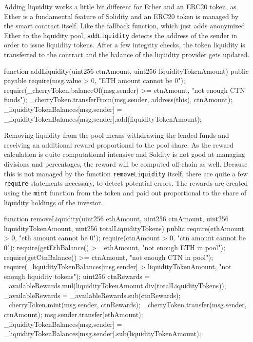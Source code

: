 Adding liquidity works a little bit different for Ether and an ERC20 token, as Ether is a fundamental feature of Solidity and an ERC20 token is managed by
the smart contract itself. Like the fallback function, which just adds anonymized Ether to the liquidity pool, \texttt{addLiquidity} detects the address
of the sender in order to issue liquidity tokens. After a few integrity checks, the token liquidity is transferred to the contract and the balance of the liquidity
provider gets updated.
\begin{GenericCode}
function addLiquidity(uint256 ctnAmount, uint256 liquidityTokenAmount) public payable {
  require(msg.value > 0, "ETH amount cannot be 0");
  require(_cherryToken.balanceOf(msg.sender) >= ctnAmount, "not enough CTN funds");
  _cherryToken.transferFrom(msg.sender, address(this), ctnAmount);
  _liquidityTokenBalances[msg.sender] = _liquidityTokenBalances[msg.sender].add(liquidityTokenAmount);
}
\end{GenericCode}

Removing liquidity from the pool means withdrawing the lended funds and receiving an additional reward proportional to the pool share.
As the reward calculation is quite computational intensive and Soldity is not good at managing divisions and percentages, the reward will be computed
off-chain as well. Because this is not managed by the function \texttt{removeLiquidity} itself, there are quite a few \texttt{require} statements necessary,
to detect potential errors. The rewards are created using the \texttt{mint} function from the token and paid out proportional to the share of liquidity holdings
of the investor.
\begin{GenericCode}
function removeLiquidity(uint256 ethAmount, uint256 ctnAmount, uint256 liquidityTokenAmount, uint256 totalLiquidityTokens) public {
  require(ethAmount > 0, "eth amount cannot be 0");
  require(ctnAmount > 0, "ctn amount cannot be 0");
  require(getEthBalance() >= ethAmount, "not enough ETH in pool");
  require(getCtnBalance() >= ctnAmount, "not enough CTN in pool");
  require(_liquidityTokenBalances[msg.sender] > liquidityTokenAmount, "not enough liquidity tokens");
  uint256 ctnRewards = _availableRewards.mul(liquidityTokenAmount.div(totalLiquidityTokens));
  _availableRewards = _availableRewards.sub(ctnRewards);
  _cherryToken.mint(msg.sender, ctnRewards);
  _cherryToken.transfer(msg.sender, ctnAmount);
  msg.sender.transfer(ethAmount);
  _liquidityTokenBalances[msg.sender] = _liquidityTokenBalances[msg.sender].sub(liquidityTokenAmount);
}
\end{GenericCode}

